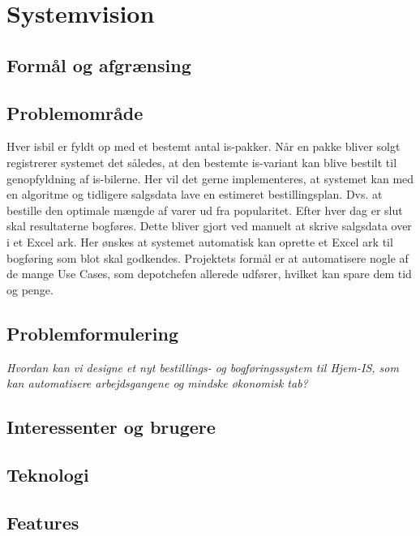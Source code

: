 \chapter{Systemvision}\label{ch:systemvision}

\section{Formål og afgrænsing}

\section{Problemområde}
Hver isbil er fyldt op med et bestemt antal is-pakker. Når en pakke bliver solgt registrerer systemet det således, at den bestemte is-variant kan blive bestilt til genopfyldning af is-bilerne. Her vil det gerne implementeres, at systemet kan med en algoritme og tidligere salgsdata lave en estimeret bestillingsplan. Dvs. at bestille den optimale mængde af varer ud fra popularitet. 
Efter hver dag er slut skal resultaterne bogføres. Dette bliver gjort ved manuelt at skrive salgsdata over i et Excel ark. Her ønskes at systemet automatisk kan oprette et Excel ark til bogføring som blot skal godkendes.
Projektets formål er at automatisere nogle af de mange Use Cases, som depotchefen allerede udfører, hvilket kan spare dem tid og penge.

\section{Problemformulering}
 \textit{Hvordan kan vi designe et nyt bestillings- og bogføringssystem til Hjem-IS, som kan automatisere arbejdsgangene og mindske økonomisk tab?} 

 \section{Interessenter og brugere}

 \section{Teknologi}

 \section{Features}